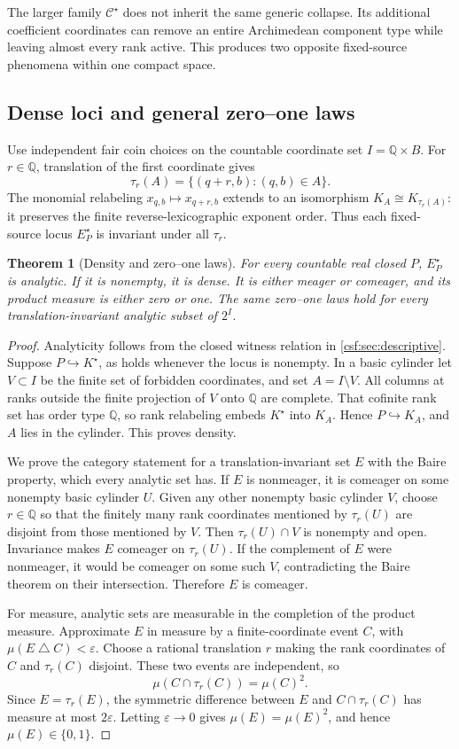 \documentclass[11pt,a4paper]{article}
\numberwithin{equation}{section}
\newtheorem{theorem}{Theorem}[section]
\theoremstyle{definition}
\theoremstyle{remark}
\newcommand{\Q}{\mathbb Q}
\newcommand{\emb}{\hookrightarrow}
\newcommand{\Cstar}{\mathcal C^{\star}}
\newcommand{\Kstar}{K^{\star}}
\begin{document}
The larger family $\Cstar$ does not inherit the same generic collapse.
Its additional coefficient coordinates can remove an entire Archimedean
component type while leaving almost every rank active. This produces two
opposite fixed-source phenomena within one compact space.

\subsection{Dense loci and general zero--one laws}

Use independent fair coin choices on the countable coordinate set
$I=\Q\times B$. For $r\in\Q$, translation of the first coordinate gives
\[
 \tau_r(A)=\{(q+r,b):(q,b)\in A\}.
\]
The monomial relabeling $x_{q,b}\mapsto x_{q+r,b}$ extends to an isomorphism
$K_A\cong K_{\tau_r(A)}$: it preserves the finite reverse-lexicographic
exponent order. Thus each fixed-source locus $E^\star_P$ is invariant under
all $\tau_r$.

\begin{theorem}[Density and zero--one laws]
\label{csf:thm:zero-one}
For every countable real closed $P$, $E^\star_P$ is analytic. If it is
nonempty, it is dense. It is either meager or comeager, and its product
measure is either zero or one. The same zero--one laws hold for every
translation-invariant analytic subset of $2^I$.
\end{theorem}
\begin{proof}
Analyticity follows from the closed witness relation in
\cref{csf:sec:descriptive}. Suppose $P\emb\Kstar$, as holds whenever the locus
is nonempty. In a basic cylinder let $V\subset I$ be the finite set of
forbidden coordinates, and set $A=I\setminus V$. All columns at ranks
outside the finite projection of $V$ onto $\Q$ are complete. That cofinite
rank set has order type $\Q$, so rank relabeling embeds $\Kstar$ into
$K_A$. Hence $P\emb K_A$, and $A$ lies in the cylinder. This proves density.

We prove the category statement for a translation-invariant set $E$ with
the Baire property, which every analytic set has. If $E$ is nonmeager, it
is comeager on some nonempty basic cylinder $U$. Given any other nonempty
basic cylinder $V$, choose $r\in\Q$ so that the finitely many rank
coordinates mentioned by $\tau_r(U)$ are disjoint from those mentioned
by $V$. Then $\tau_r(U)\cap V$ is nonempty and open. Invariance makes $E$
comeager on $\tau_r(U)$. If the complement of $E$ were nonmeager, it would
be comeager on some such $V$, contradicting the Baire theorem on their
intersection. Therefore $E$ is comeager.

For measure, analytic sets are measurable in the completion of the product
measure. Approximate $E$ in measure by a finite-coordinate event $C$,
with $\mu(E\mathbin\triangle C)<\varepsilon$. Choose a rational translation
$r$ making the rank coordinates of $C$ and $\tau_r(C)$ disjoint. These two
events are independent, so
\[
 \mu(C\cap\tau_r(C))=\mu(C)^2.
\]
Since $E=\tau_r(E)$, the symmetric difference between $E$ and
$C\cap\tau_r(C)$ has measure at most $2\varepsilon$. Letting
$\varepsilon\to0$ gives $\mu(E)=\mu(E)^2$, and hence $\mu(E)\in\{0,1\}$.
\end{proof}
\end{document}
